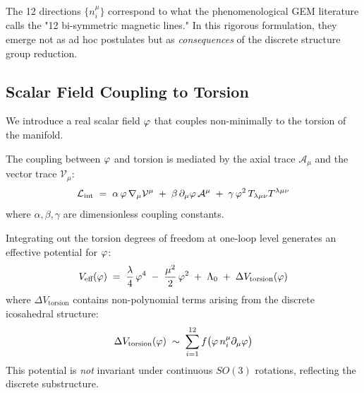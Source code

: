 \begin{remark}
The 12 directions $\{n_i^\mu\}$ correspond to what the phenomenological GEM literature calls the "12 bi-symmetric magnetic lines." In this rigorous formulation, they emerge not as ad hoc postulates but as \textit{consequences} of the discrete structure group reduction.
\end{remark}

\subsection{Scalar Field Coupling to Torsion}

We introduce a real scalar field $\varphi$ that couples non-minimally to the torsion of the manifold.

\begin{definition}
The coupling between $\varphi$ and torsion is mediated by the axial trace $\mathcal{A}_\mu$ and the vector trace $\mathcal{V}_\mu$:
\begin{equation}
    \mathcal{L}_{\text{int}} \;=\; \alpha\, \varphi\, \nabla_\mu \mathcal{V}^\mu \;+\; \beta\, \partial_\mu \varphi\, \mathcal{A}^\mu \;+\; \gamma\, \varphi^2\, T_{\lambda\mu\nu}T^{\lambda\mu\nu}
\end{equation}
where $\alpha, \beta, \gamma$ are dimensionless coupling constants.
\end{definition}

\begin{proposition}
Integrating out the torsion degrees of freedom at one-loop level generates an effective potential for $\varphi$:
\begin{equation}
    V_{\text{eff}}(\varphi) \;=\; \frac{\lambda}{4}\,\varphi^4 \;-\; \frac{\mu^2}{2}\,\varphi^2 \;+\; \Lambda_0 \;+\; \Delta V_{\text{torsion}}(\varphi)
\end{equation}
where $\Delta V_{\text{torsion}}$ contains non-polynomial terms arising from the discrete icosahedral structure:
\begin{equation}
    \Delta V_{\text{torsion}}(\varphi) \;\sim\; \sum_{i=1}^{12} f\big(\varphi\, n_i^\mu \partial_\mu \varphi\big)
\end{equation}
This potential is \textit{not} invariant under continuous $SO(3)$ rotations, reflecting the discrete substructure.
\end{proposition}

